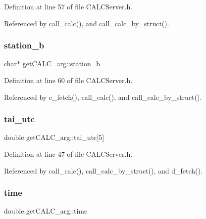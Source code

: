 Definition at line 57 of file C\+A\+L\+C\+Server.\+h.



Referenced by call\+\_\+calc(), and call\+\_\+calc\+\_\+by\+\_\+struct().

\mbox{\label{structget_c_a_l_c__arg_a2f9338a38efce8d3bf0f52e25b7e1d27}} 
\subsubsection{\texorpdfstring{station\+\_\+b}{station\_b}}
{\footnotesize\ttfamily char$\ast$ get\+C\+A\+L\+C\+\_\+arg\+::station\+\_\+b}



Definition at line 60 of file C\+A\+L\+C\+Server.\+h.



Referenced by c\+\_\+fetch(), call\+\_\+calc(), and call\+\_\+calc\+\_\+by\+\_\+struct().

\mbox{\label{structget_c_a_l_c__arg_add5a9d3192a33c3ce58d81f093af17b6}} 
\subsubsection{\texorpdfstring{tai\+\_\+utc}{tai\_utc}}
{\footnotesize\ttfamily double get\+C\+A\+L\+C\+\_\+arg\+::tai\+\_\+utc\mbox{[}5\mbox{]}}



Definition at line 47 of file C\+A\+L\+C\+Server.\+h.



Referenced by call\+\_\+calc(), call\+\_\+calc\+\_\+by\+\_\+struct(), and d\+\_\+fetch().

\mbox{\label{structget_c_a_l_c__arg_a6fadabd73a2bc43fed35806cc6aa9045}} 
\subsubsection{\texorpdfstring{time}{time}}
{\footnotesize\ttfamily double get\+C\+A\+L\+C\+\_\+arg\+::time}



